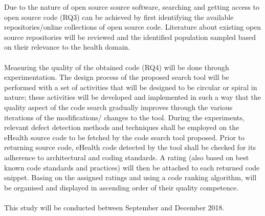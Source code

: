 \documentclass[a4paper]{article}
\begin{document}
Due to the nature of open source source software, searching and getting access to open source code (RQ3) can be achieved by first identifying the available repositories/online collections of open source code. Literature about existing open source repositories will be reviewed and the identified population sampled based on their relevance to the health domain.\\ \\
Measuring the quality of the obtained code (RQ4) will be done through experimentation. The design process of the proposed search tool will be performed with a set of activities that will be designed to be circular or spiral in nature; these activities will be developed and implemented in such a way that the quality aspect of the code search gradually improves through the various iterations of the modifications/ changes to the tool. During the experiments, relevant defect detection methods and techniques shall be employed on the eHealth source code to be fetched by the code search tool proposed. Prior to returning source code, eHealth code detected by the tool shall be checked for its adherence to architectural and coding standards. A rating (also based on best known code standards and practices) will then be attached to each returned code snippet. Basing on the assigned ratings and using a code ranking algorithm, will be organised and displayed in ascending order of their quality competence.  \\ \\This study will be conducted between September and December 2018.
\vspace{-10pt}
\end{document}
